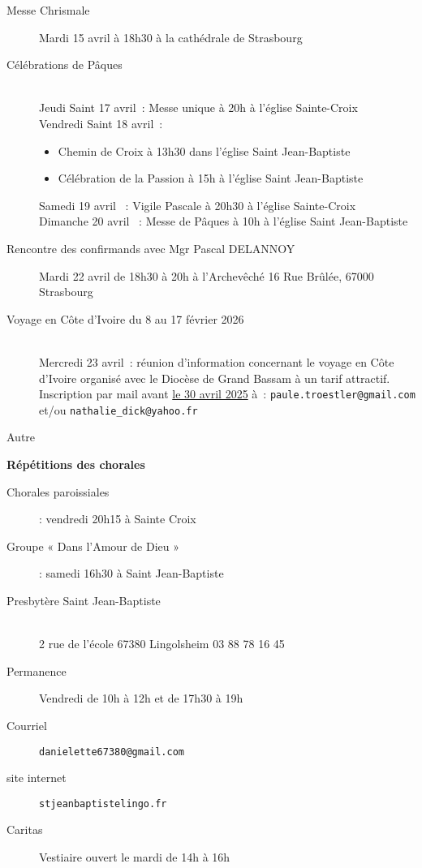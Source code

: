 \documentclass[11pt,a4paper]{article}
\begin{document}
\begin{framed}
\begin{description}
\item[Messe Chrismale]
Mardi 15 avril à 18h30 à la cathédrale de Strasbourg
\item[Célébrations de Pâques]
~\\
Jeudi Saint 17 avril : Messe unique à 20h à l’église Sainte-Croix\\
Vendredi Saint 18 avril :
\begin{itemize}
\item[]
Chemin de Croix à 13h30 dans l’église Saint Jean-Baptiste
\item[]
Célébration de la Passion à 15h à l’église Saint Jean-Baptiste
\end{itemize}
Samedi 19 avril              : Vigile Pascale à 20h30 à l’église Sainte-Croix\\
Dimanche 20 avril         : Messe de Pâques à 10h à l’église Saint Jean-Baptiste
\item[Rencontre des confirmands avec Mgr Pascal DELANNOY]
Mardi 22 avril de 18h30 à 20h à l’Archevêché 16 Rue Brûlée, 67000 Strasbourg
\item[Voyage en Côte d’Ivoire du 8 au 17 février 2026]
~\\
Mercredi 23 avril : réunion d’information concernant le voyage en Côte d’Ivoire
organisé avec le Diocèse de Grand Bassam à un tarif attractif.
Inscription par mail avant \underline{le 30 avril 2025} à : \texttt{paule.troestler@gmail.com} et/ou   \texttt{nathalie\_dick@yahoo.fr}
\item[Autre]
\end{description}
\end{framed}


\textbf{Répétitions des chorales}
\begin{description}
\item[Chorales paroissiales] : vendredi 20h15 à Sainte Croix
\item[Groupe « Dans l’Amour de Dieu »] : samedi 16h30 à Saint Jean-Baptiste
\end{description}

\begin{framed}
\begin{description}
\item[Presbytère Saint Jean-Baptiste]
~\\
2 rue de l'école 67380 Lingolsheim 03 88 78 16 45
\item[Permanence] Vendredi de 10h à 12h et de 17h30 à 19h
\item[Courriel] \texttt{danielette67380@gmail.com}
\item[site internet] \texttt{stjeanbaptistelingo.fr}
\item[Caritas] Vestiaire ouvert le mardi de 14h à 16h
\end{description}
\end{framed}
\end{document}

